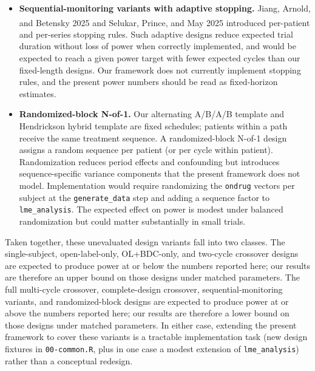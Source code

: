 \documentclass[
  11pt,
]{article}
\begin{document}
\begin{itemize}
  and Song, Zheng, Wang, Chow, and Sun
  2021\textsuperscript{}
  use complete N-of-1 designs in which every treatment permutation
  appears with replacement. These designs are provably most efficient
  for bioequivalence under linear mixed-effects analysis. The
  pmsimstats-ng framework represents designs as lists of \texttt{ondrug}
  vectors, which can encode these structures in principle, but the
  fixtures were not built for the present sweeps. Reported power for
  biosimilar-style applications should be treated as a lower bound on
  what a complete-design analysis would achieve.
\item
  \textbf{Sequential-monitoring variants with adaptive stopping.} Jiang,
  Arnold, and Betensky
  2025\textsuperscript{} and
  Selukar, Prince, and May
  2025\textsuperscript{}
  introduced per-patient and per-series stopping rules. Such adaptive
  designs reduce expected trial duration without loss of power when
  correctly implemented, and would be expected to reach a given power
  target with fewer expected cycles than our fixed-length designs. Our
  framework does not currently implement stopping rules, and the present
  power numbers should be read as fixed-horizon estimates.
\item
  \textbf{Randomized-block N-of-1.} Our alternating A/B/A/B template and
  Hendrickson hybrid template are fixed schedules; patients within a
  path receive the same treatment sequence. A randomized-block N-of-1
  design assigns a random sequence per patient (or per cycle within
  patient). Randomization reduces period effects and confounding but
  introduces sequence-specific variance components that the present
  framework does not model. Implementation would require randomizing the
  \texttt{ondrug} vectors per subject at the \texttt{generate\_data}
  step and adding a sequence factor to \texttt{lme\_analysis}. The
  expected effect on power is modest under balanced randomization but
  could matter substantially in small trials.
\end{itemize}

Taken together, these unevaluated design variants fall into two classes.
The single-subject, open-label-only, OL+BDC-only, and two-cycle
crossover designs are expected to produce power at or below the numbers
reported here; our results are therefore an upper bound on those designs
under matched parameters. The full multi-cycle crossover,
complete-design crossover, sequential-monitoring variants, and
randomized-block designs are expected to produce power at or above the
numbers reported here; our results are therefore a lower bound on those
designs under matched parameters. In either case, extending the present
framework to cover these variants is a tractable implementation task
(new design fixtures in \texttt{00-common.R}, plus in one case a modest
extension of \texttt{lme\_analysis}) rather than a conceptual redesign.
\end{document}
